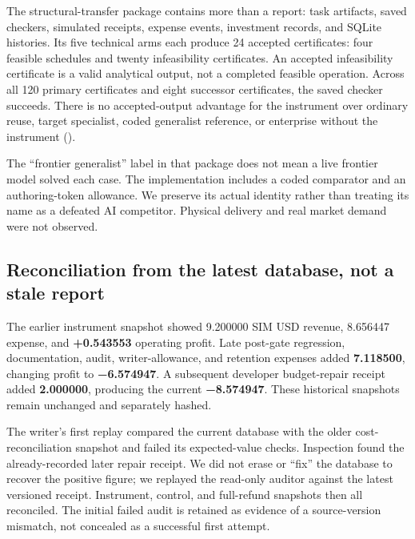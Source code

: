 The structural-transfer package contains more than a report: task
artifacts, saved checkers, simulated receipts, expense events,
investment records, and SQLite histories. Its five technical arms each
produce 24 accepted certificates: four feasible schedules and twenty
infeasibility certificates. An accepted infeasibility certificate is a
valid analytical output, not a completed feasible operation. Across all
120 primary certificates and eight successor certificates, the saved
checker succeeds. There is no accepted-output advantage for the
instrument over ordinary reuse, target specialist, coded generalist
reference, or enterprise without the instrument
().

The ``frontier generalist'' label in that package does not mean a live
frontier model solved each case. The implementation includes a coded
comparator and an authoring-token allowance. We preserve its actual
identity rather than treating its name as a defeated AI competitor.
Physical delivery and real market demand were not observed.

\subsection{Reconciliation from the latest database, not a stale
report}\label{reconciliation-from-the-latest-database-not-a-stale-report}

The earlier instrument snapshot showed 9.200000 SIM USD revenue,
8.656447 expense, and \textbf{+0.543553} operating profit. Late
post-gate regression, documentation, audit, writer-allowance, and
retention expenses added \textbf{7.118500}, changing profit to
\textbf{−6.574947}. A subsequent developer budget-repair receipt added
\textbf{2.000000}, producing the current \textbf{−8.574947}. These
historical snapshots remain unchanged and separately hashed.

The writer's first replay compared the current database with the older
cost-reconciliation snapshot and failed its expected-value checks.
Inspection found the already-recorded later repair receipt. We did not
erase or ``fix'' the database to recover the positive figure; we
replayed the read-only auditor against the latest versioned receipt.
Instrument, control, and full-refund snapshots then all reconciled. The
initial failed audit is retained as evidence of a source-version
mismatch, not concealed as a successful first attempt.


